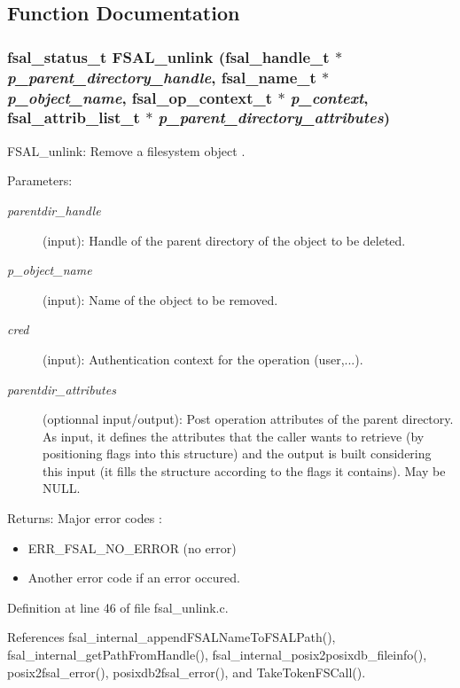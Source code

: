 \subsection{Function Documentation}
\subsubsection[{FSAL\_\-unlink}]{\setlength{\rightskip}{0pt plus 5cm}fsal\_\-status\_\-t FSAL\_\-unlink (fsal\_\-handle\_\-t $\ast$ {\em p\_\-parent\_\-directory\_\-handle}, \/  fsal\_\-name\_\-t $\ast$ {\em p\_\-object\_\-name}, \/  fsal\_\-op\_\-context\_\-t $\ast$ {\em p\_\-context}, \/  fsal\_\-attrib\_\-list\_\-t $\ast$ {\em p\_\-parent\_\-directory\_\-attributes})}\label{fsal__unlink_8c_62205ee948a0c423a40868222991ec1c}


FSAL\_\-unlink: Remove a filesystem object .

\begin{Desc}
\item[Parameters:]
\begin{description}
\item[{\em parentdir\_\-handle}](input): Handle of the parent directory of the object to be deleted. \item[{\em p\_\-object\_\-name}](input): Name of the object to be removed. \item[{\em cred}](input): Authentication context for the operation (user,...). \item[{\em parentdir\_\-attributes}](optionnal input/output): Post operation attributes of the parent directory. As input, it defines the attributes that the caller wants to retrieve (by positioning flags into this structure) and the output is built considering this input (it fills the structure according to the flags it contains). May be NULL.\end{description}
\end{Desc}
\begin{Desc}
\item[Returns:]Major error codes :\begin{itemize}
\item ERR\_\-FSAL\_\-NO\_\-ERROR (no error)\item Another error code if an error occured. \end{itemize}
\end{Desc}


Definition at line 46 of file fsal\_\-unlink.c.

References fsal\_\-internal\_\-appendFSALNameToFSALPath(), fsal\_\-internal\_\-getPathFromHandle(), fsal\_\-internal\_\-posix2posixdb\_\-fileinfo(), posix2fsal\_\-error(), posixdb2fsal\_\-error(), and TakeTokenFSCall().